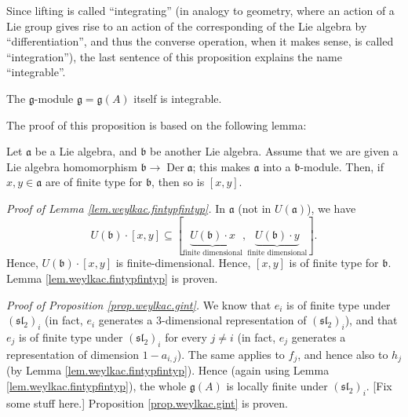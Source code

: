 \documentclass[etingof-lie.tex]{subfiles}
\begin{document}
Since lifting is called ``integrating'' (in analogy to geometry, where an
action of a Lie group gives rise to an action of the corresponding of the Lie
algebra by ``differentiation'', and thus the converse operation, when it makes
sense, is called ``integration''), the last sentence of this proposition
explains the name ``integrable''.

\begin{proposition}
\label{prop.weylkac.gint}The $\mathfrak{g}$-module $\mathfrak{g}%
=\mathfrak{g}\left(  A\right)  $ itself is integrable.
\end{proposition}

The proof of this proposition is based on the following lemma:

\begin{lemma}
\label{lem.weylkac.fintypfintyp}Let $\mathfrak{a}$ be a Lie algebra, and
$\mathfrak{b}$ be another Lie algebra. Assume that we are given a Lie algebra
homomorphism $\mathfrak{b}\rightarrow\operatorname*{Der}\mathfrak{a}$; this
makes $\mathfrak{a}$ into a $\mathfrak{b}$-module. Then, if $x,y\in
\mathfrak{a}$ are of finite type for $\mathfrak{b}$, then so is $\left[
x,y\right]  $.
\end{lemma}

\textit{Proof of Lemma \ref{lem.weylkac.fintypfintyp}.} In $\mathfrak{a}$ (not
in $U\left(  \mathfrak{a}\right)  $), we have%
\[
U\left(  \mathfrak{b}\right)  \cdot\left[  x,y\right]  \subseteq\left[
\underbrace{U\left(  \mathfrak{b}\right)  \cdot x}_{\text{finite dimensional}%
},\underbrace{U\left(  \mathfrak{b}\right)  \cdot y}_{\text{finite
dimensional}}\right]  .
\]
Hence, $U\left(  \mathfrak{b}\right)  \cdot\left[  x,y\right]  $ is
finite-dimensional. Hence, $\left[  x,y\right]  $ is of finite type for
$\mathfrak{b}$. Lemma \ref{lem.weylkac.fintypfintyp} is proven.

\textit{Proof of Proposition \ref{prop.weylkac.gint}.} We know that $e_{i}$ is
of finite type under $\left(  \mathfrak{sl}_{2}\right)  _{i}$ (in fact,
$e_{i}$ generates a $3$-dimensional representation of $\left(  \mathfrak{sl}%
_{2}\right)  _{i}$), and that $e_{j}$ is of finite type under $\left(
\mathfrak{sl}_{2}\right)  _{i}$ for every $j\neq i$ (in fact, $e_{j}$
generates a representation of dimension $1-a_{i,j}$). The same applies to
$f_{j}$, and hence also to $h_{j}$ (by Lemma \ref{lem.weylkac.fintypfintyp}).
Hence (again using Lemma \ref{lem.weylkac.fintypfintyp}), the whole
$\mathfrak{g}\left(  A\right)  $ is locally finite under $\left(
\mathfrak{sl}_{2}\right)  _{i}$. [Fix some stuff here.] Proposition
\ref{prop.weylkac.gint} is proven.
\end{document}
